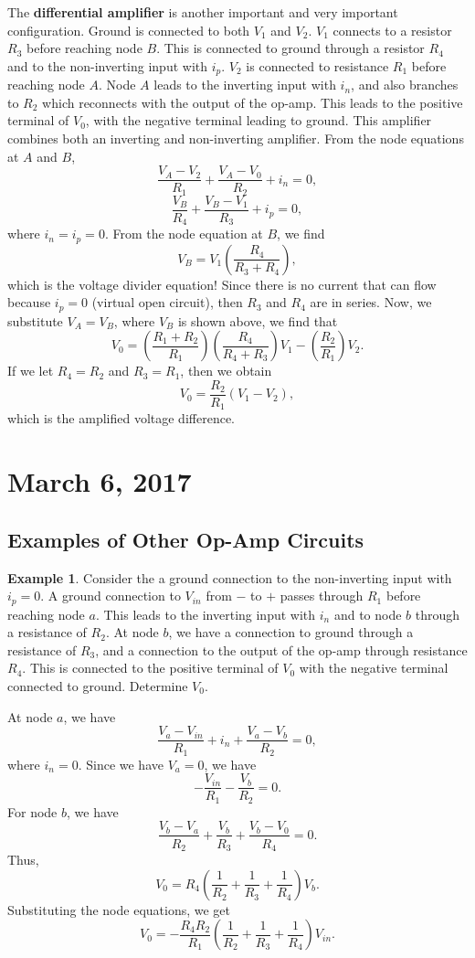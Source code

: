 \documentclass[11pt]{article}
\theoremstyle{plain} %
\theoremstyle{definition}
\theoremstyle{example}
\newtheorem*{example}{Example}
\theoremstyle{remark}
\begin{document}
The \textbf{differential amplifier} is another important and very important configuration. Ground is connected to both $V_1$ and $V_2$. $V_1$ connects to a resistor $R_3$ before reaching node $B$. This is connected to ground through a resistor $R_4$ and to the non-inverting input with $i_p$. $V_2$ is connected to resistance $R_1$ before reaching node $A$. Node $A$ leads to the inverting input with $i_n$, and also branches to $R_2$ which reconnects with the output of the op-amp. This leads to the positive terminal of $V_0$, with the negative terminal leading to ground. This amplifier combines both an inverting and non-inverting amplifier. From the node equations at $A$ and $B$, 
$$\frac{V_A-V_2}{R_1} + \frac{V_A-V_0}{R_2} + i_n = 0,$$
$$\frac{V_B}{R_4} + \frac{V_B-V_1}{R_3} + i_p = 0,$$
where $i_n=i_p=0$. 
From the node equation at $B$, we find 
$$V_B = V_1\left(\frac{R_4}{R_3+R_4}\right),$$
which is the voltage divider equation! Since there is no current that can flow because $i_p=0$ (virtual open circuit), then $R_3$ and $R_4$ are in series. Now, we substitute $V_A = V_B$, where $V_B$ is shown above, we find that 
$$V_0 = \left(\frac{R_1+R_2}{R_1}\right)\left(\frac{R_4}{R_4+R_3}\right)V_1 - \left(\frac{R_2}{R_1}\right)V_2.$$
If we let $R_4=R_2$ and $R_3=R_1$, then we obtain 
$$V_0 = \frac{R_2}{R_1}(V_1-V_2),$$
which is the amplified voltage difference. 

\section{March 6, 2017}
\subsection{Examples of Other Op-Amp Circuits}

\begin{example}
Consider the a ground connection to the non-inverting input with $i_p=0$. A ground connection to $V_{in}$ from $-$ to $+$ passes through $R_1$ before reaching node $a$. This leads to the inverting input with $i_n$ and to node $b$ through a resistance of $R_2$. At node $b$, we have a connection to ground through a resistance of $R_3$, and a connection to the output of the op-amp through resistance $R_4$. This is connected to the positive terminal of $V_0$ with the negative terminal connected to ground. Determine $V_0$. 
\end{example}

At node $a$, we have 
$$\frac{V_a-V_{in}}{R_1} + i_n + \frac{V_a-V_b}{R_2}=0,$$
where $i_n=0$. Since we have $V_a=0$, we have 
$$-\frac{V_{in}}{R_1} - \frac{V_b}{R_2} = 0.$$For node $b$, we have 
$$\frac{V_b-V_a}{R_2} + \frac{V_b}{R_3} + \frac{V_b-V_0}{R_4} = 0.$$
Thus, $$V_0 = R_4\left(\frac{1}{R_2} + \frac{1}{R_3} + \frac{1}{R_4}\right)V_b.$$
Substituting the node equations, we get 
$$V_0 =- \frac{R_4R_2}{R_1}\left(\frac{1}{R_2} + \frac{1}{R_3} + \frac{1}{R_4}\right)V_{in}.$$
\end{document}
